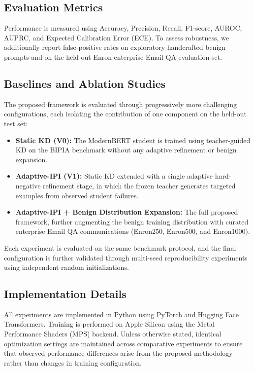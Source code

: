 \documentclass[conference]{IEEEtran}
\begin{document}
\subsection{Evaluation Metrics}

Performance is measured using Accuracy, Precision, Recall, F1-score, AUROC, AUPRC, and Expected
Calibration Error (ECE). To assess robustness, we additionally report false-positive rates on
exploratory handcrafted benign prompts and on the held-out Enron enterprise Email QA evaluation set.

\subsection{Baselines and Ablation Studies}

The proposed framework is evaluated through progressively more challenging configurations, each
isolating the contribution of one component on the held-out test set:
\begin{itemize}
    \item \textbf{Static KD (V0):} The ModernBERT student is trained using teacher-guided KD on the BIPIA benchmark without any adaptive refinement or benign expansion.
    \item \textbf{Adaptive-IPI (V1):} Static KD extended with a single adaptive hard-negative refinement stage, in which the frozen teacher generates targeted examples from observed student failures.
    \item \textbf{Adaptive-IPI + Benign Distribution Expansion:} The full proposed framework, further augmenting the benign training distribution with curated enterprise Email QA communications (Enron250, Enron500, and Enron1000).
\end{itemize}

Each experiment is evaluated on the same benchmark protocol, and the final configuration is further
validated through multi-seed reproducibility experiments using independent random initializations.

\subsection{Implementation Details}

All experiments are implemented in Python using PyTorch and Hugging Face Transformers. Training is
performed on Apple Silicon using the Metal Performance Shaders (MPS) backend. Unless otherwise
stated, identical optimization settings are maintained across comparative experiments to ensure that
observed performance differences arise from the proposed methodology rather than changes in training
configuration.
\end{document}
